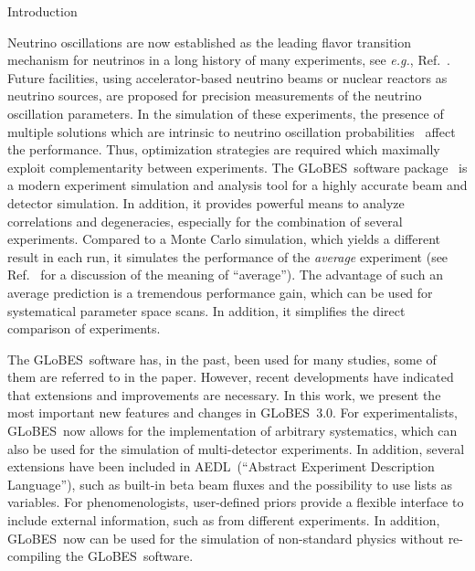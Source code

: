 \documentclass[12pt,a4paper]{article}
\makeatletter
\renewcommand{\section}{\@startsection{section}{1}{0em}{-\baselineskip}%
{\baselineskip}{\normalfont\large\bfseries}}
\newcommand{\eg}{{\it e.g.}}
\newcommand{\Ref}{Ref.}
\newcommand{\GLOBES}{{\sf GLoBES}}
\newcommand{\GLOBESN}{{\sf GLoBES~3.0}}
\newcommand{\AEDL}{{\sf AEDL}}
\makeatother
\begin{document}
\section{Introduction}

Neutrino oscillations are now established as the leading flavor
transition mechanism for neutrinos in a long history of many experiments, see
\eg , \Ref~\cite{Barger:2003qi}. Future facilities, using accelerator-based
 neutrino beams or nuclear reactors as neutrino sources, are proposed
for precision measurements of the neutrino oscillation parameters. In the
simulation of these experiments, 
the presence of multiple solutions which are intrinsic to
 neutrino oscillation probabilities~\cite{Fogli:1996pv,Burguet-Castell:2001ez,Minakata:2001qm,Barger:2001yr} 
affect the performance.
Thus, optimization strategies are required which maximally exploit 
complementarity between experiments. The \GLOBES\ software package~\cite{Huber:2004ka}
is a  modern experiment  simulation  and analysis tool for
a highly accurate beam and detector simulation. In addition, it provides powerful 
means to analyze correlations and degeneracies, especially for the combination
of several experiments. Compared to a Monte Carlo simulation, which yields a different
result in each run, it simulates the performance of the {\em average} experiment
(see \Ref~\cite{Schwetz:2006md} for a discussion of the meaning of ``average'').
The advantage of such an average prediction is a tremendous performance gain,
which can be used for systematical parameter space scans. In addition, it 
simplifies the direct comparison of experiments.

The \GLOBES\ software has, in the past, been used for many studies, some of them
are referred to in the paper. However, recent developments have indicated that extensions
and improvements are necessary. In this work, we present the most important new
features and changes in \GLOBESN . For experimentalists, \GLOBES\ now allows
for the implementation of arbitrary systematics, which can also be used for
the simulation of multi-detector experiments. In addition, several extensions
have been included in \AEDL\ (``Abstract Experiment Description Language''), such as
built-in beta beam fluxes and the possibility to use lists as variables.
For phenomenologists, user-defined
priors provide a flexible interface to include external information, such as from
different experiments. In addition, \GLOBES\ now can be used for the simulation
of non-standard physics without re-compiling the \GLOBES\ software.
\end{document}
